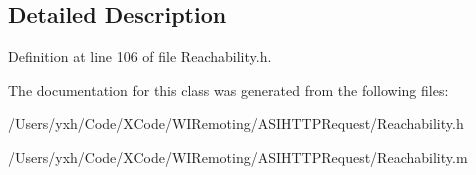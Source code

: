 \subsection{Detailed Description}


Definition at line 106 of file Reachability.h.

The documentation for this class was generated from the following files:\begin{DoxyCompactItemize}
\item 
/Users/yxh/Code/XCode/WIRemoting/ASIHTTPRequest/Reachability.h\item 
/Users/yxh/Code/XCode/WIRemoting/ASIHTTPRequest/Reachability.m\end{DoxyCompactItemize}
